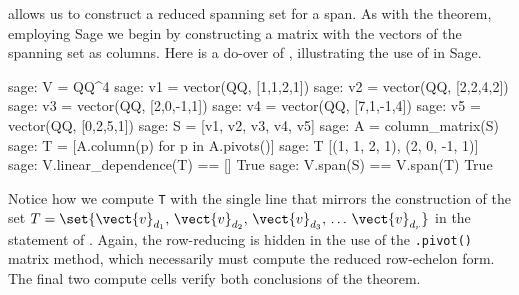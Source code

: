 allows us to construct a reduced spanning set for a span.  As with the theorem, employing Sage we begin by constructing a matrix with the vectors of the spanning set as columns.  Here is a do-over of , illustrating the use of  in Sage.
%
\begin{sageexample}
sage: V = QQ^4
sage: v1 = vector(QQ, [1,1,2,1])
sage: v2 = vector(QQ, [2,2,4,2])
sage: v3 = vector(QQ, [2,0,-1,1])
sage: v4 = vector(QQ, [7,1,-1,4])
sage: v5 = vector(QQ, [0,2,5,1])
sage: S = [v1, v2, v3, v4, v5]
sage: A = column_matrix(S)
sage: T = [A.column(p) for p in A.pivots()]
sage: T
[(1, 1, 2, 1), (2, 0, -1, 1)]
sage: V.linear_dependence(T) == []
True
sage: V.span(S) == V.span(T)
True
\end{sageexample}
%
Notice how we compute \verb?T? with the single line that mirrors the construction of the set $T=\set{\vect{v}_{d_1},\,\vect{v}_{d_2},\,\vect{v}_{d_3},\,\ldots\,\vect{v}_{d_r}}$ in the statement of .  Again, the row-reducing is hidden in the use of the \verb?.pivot()? matrix method, which necessarily must compute the reduced row-echelon form.  The final two compute cells verify both conclusions of the theorem.
%
\begin{sageverbatim}
\end{sageverbatim}
%
